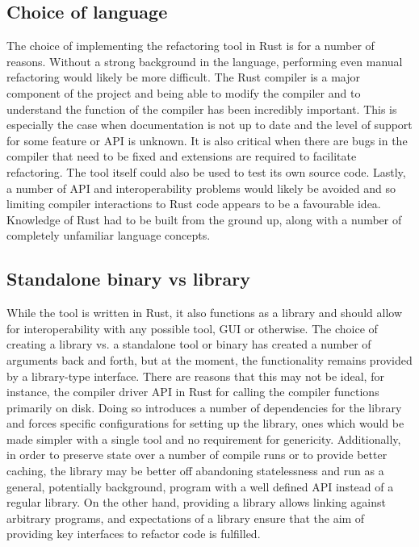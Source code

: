 \subsection{Choice of language}
The choice of implementing the refactoring tool in Rust is for a number of reasons. Without a strong background in the language, performing even manual refactoring would likely be more difficult. The Rust compiler is a major component of the project and being able to modify the compiler and to understand the function of the compiler has been incredibly important. This is especially the case when documentation is not up to date and the level of support for some feature or API is unknown. It is also critical when there are bugs in the compiler that need to be fixed and extensions are required to facilitate refactoring. The tool itself could also be used to test its own source code. Lastly, a number of API and interoperability problems would likely be avoided and so limiting compiler interactions to Rust code appears to be a favourable idea. Knowledge of Rust had to be built from the ground up, along with a number of completely unfamiliar language concepts.

\subsection{Standalone binary vs library}
While the tool is written in Rust, it also functions as a library and should allow for interoperability with any possible tool, GUI or otherwise. The choice of creating a library vs. a standalone tool or binary has created a number of arguments back and forth, but at the moment, the functionality remains provided by a library-type interface. There are reasons that this may not be ideal, for instance, the compiler driver API in Rust for calling the compiler functions primarily on disk. Doing so introduces a number of dependencies for the library and forces specific configurations for setting up the library, ones which would be made simpler with a single tool and no requirement for genericity. Additionally, in order to preserve state over a number of compile runs or to provide better caching, the library may be better off abandoning statelessness and run as a general, potentially background, program with a well defined API instead of a regular library. On the other hand, providing a library allows linking against arbitrary programs, and expectations of a library ensure that the aim of providing key interfaces to refactor code is fulfilled.

